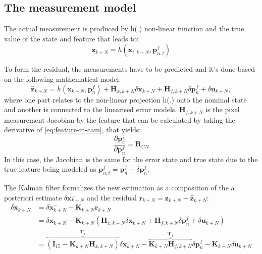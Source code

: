 \subsection{The measurement model}

The actual measurement is produced by h(.) non-linear function and the true value of the state and feature that leads to:
\begin{equation}
    \mathbf{z}_{k+N} = h(\mathbf{x}_{t,k+N},\mathbf{p}_{n,t}^f)
\end{equation}

To form the residual, the measurements have to be predicted and it's done based on the following mathematical model:
\begin{equation}
    \hat{\mathbf{z}}_{k+N} = h(\mathbf{x}_{k+N},\mathbf{p}_{n}^f) + \mathbf{H}_{x,k+N}\delta\mathbf{x}_{k+N}+\mathbf{H}_{f, k+N}\delta\mathbf{p}_{n}^f + \delta\mathbf{u}_{k+N}, 
\end{equation}
where one part relates to the non-linear projection h(.) onto the nominal state and another is connected to the linearised error models. $\mathbf{H}_{f,k+N}$ is the pixel measurement Jacobian by the feature that can be calculated by taking the derivative of \eqref{eq:feature-in-cam}, that yields:
\begin{equation}
    \frac{\partial\mathbf{p}_c^f}{\partial\mathbf{p}_n^f}=\mathbf{R}_{CN}
\end{equation}
In this case, the Jacobian is the same for the error state and true state due to the true feature being modeled as $\mathbf{p}_{n,t}^f=\mathbf{p}_n^f+\delta\mathbf{p}_n^f$.

The Kalman filter formalizes the new estimation as a composition of the a posteriori estimate $\delta\mathbf{x}_{k+N}^-$ and the residual $\mathbf{r}_{k+N}=\mathbf{z}_{k+N}-\hat{\mathbf{z}}_{k+N}$:
\begin{equation}
\begin{aligned}
    \delta\mathbf{x}_{k+N} &= \delta\mathbf{x}_{k+N}^-+\mathbf{K}_{k+N}\mathbf{r}_{k+N} \\ &=
    \delta\mathbf{x}_{k+N}^--\mathbf{K}_{k+N}(\mathbf{H}_{x,k+N}\delta\mathbf{x}_{k+N}^-+\mathbf{H}_{f, k+N}\delta\mathbf{p}_{n}^f + \delta\mathbf{u}_{k+N}) \\ &=
    \overbrace{\left(\mathbf{I}_{15}-\mathbf{K}_{k+N}\mathbf{H}_{x,k+N}\right)}^{\mathbf{T}_x}\delta\mathbf{x}_{k+N}^--\overbrace{\mathbf{K}_{k+N}\mathbf{H}_{f,k+N}}^{\mathbf{T}_f}\delta\mathbf{p}_n^f - \mathbf{K}_{k+N}\delta\mathbf{u}_{k+N}
    \label{eq:pred-err-state}
\end{aligned}
\end{equation}

